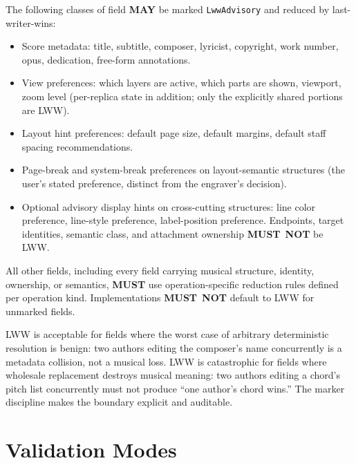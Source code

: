 \documentclass[11pt,letterpaper]{report}
\newcounter{requirement}[chapter]
\newcommand{\MUST}{\textbf{MUST}}
\newcommand{\MUSTNOT}{\textbf{MUST}\nobreak\ \textbf{NOT}}
\newcommand{\MAY}{\textbf{MAY}}
\begin{document}
\begin{requirement}
  \label{req:semops:lww-advisory-fields}
  The following classes of field \MAY{} be marked
  \texttt{LwwAdvisory} and reduced by last-writer-wins:

  \begin{itemize}
    \item Score metadata: title, subtitle, composer, lyricist,
      copyright, work number, opus, dedication, free-form
      annotations.
    \item View preferences: which layers are active, which parts
      are shown, viewport, zoom level (per-replica state in
      addition; only the explicitly shared portions are LWW).
    \item Layout hint preferences: default page size, default
      margins, default staff spacing recommendations.
    \item Page-break and system-break preferences on layout-semantic
      structures (the user's stated preference, distinct from the
      engraver's decision).
    \item Optional advisory display hints on cross-cutting
      structures: line color preference, line-style preference,
      label-position preference. Endpoints, target identities,
      semantic class, and attachment ownership \MUSTNOT{} be
      LWW.
  \end{itemize}

  All other fields, including every field carrying musical
  structure, identity, ownership, or semantics, \MUST{} use
  operation-specific reduction rules defined per operation kind.
  Implementations \MUSTNOT{} default to LWW for unmarked fields.
\end{requirement}

\begin{rationale}
  LWW is acceptable for fields where the worst case of arbitrary
  deterministic resolution is benign: two authors editing the
  composer's name concurrently is a metadata collision, not a
  musical loss. LWW is catastrophic for fields where wholesale
  replacement destroys musical meaning: two authors editing a
  chord's pitch list concurrently must not produce ``one author's
  chord wins.'' The marker discipline makes the boundary explicit
  and auditable.
\end{rationale}

\section{Validation Modes}
\label{sec:semops:validation}
\end{document}
